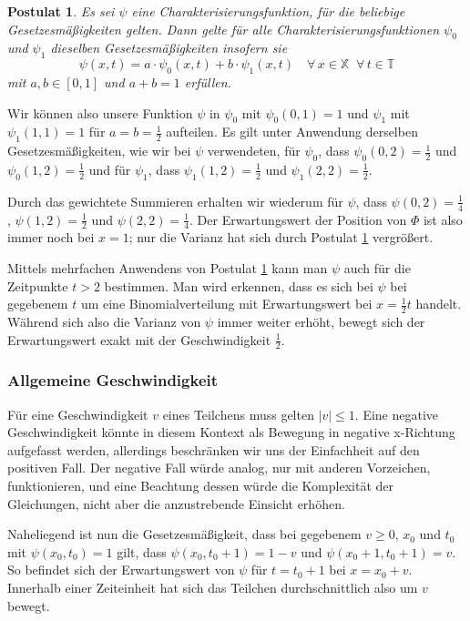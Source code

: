 \documentclass[a4paper,12pt,ngerman]{scrartcl}
\theoremstyle{plain}
\theoremstyle{plain}
\theoremstyle{plain}
\newtheorem{postulate}{Postulat}
\theoremstyle{plain}
\newcommand{\T}{\mathbb{T}}
\newcommand{\X}{\mathbb{X}}
\begin{document}
{
\begin{postulate}\label{pos_einstein}
Es sei $\psi$ eine Charakterisierungsfunktion, für die beliebige Gesetzesmäßigkeiten gelten. Dann gelte für alle Charakterisierungsfunktionen $\psi_0$ und $\psi_1$ dieselben Gesetzesmäßigkeiten insofern sie
\[\psi(x,t)=a\cdot\psi_0(x,t)+b\cdot\psi_1(x,t)\quad\forall\,x\in\X\;\;\forall\,t \in\T\]
mit $a,b\in[0,1]$ und $a+b=1$ erfüllen.
\end{postulate}
}

Wir können also unsere Funktion $\psi$ in $\psi_0$ mit $\psi_0(0,1)=1$ und $\psi_1$ mit $\psi_1(1,1)=1$ für $a=b=\frac{1}{2}$ aufteilen. Es gilt unter Anwendung derselben Gesetzesmäßigkeiten, wie wir bei $\psi$ verwendeten, für $\psi_0$, dass $\psi_0(0,2)=\frac{1}{2}$ und $\psi_0(1,2)=\frac{1}{2}$ und für $\psi_1$, dass $\psi_1(1,2)=\frac{1}{2}$ und $\psi_1(2,2)=\frac{1}{2}$. 

Durch das gewichtete Summieren erhalten wir wiederum für $\psi$, dass $\psi(0,2)=\frac{1}{4}$, $\psi(1,2)=\frac{1}{2}$ und $\psi(2,2)=\frac{1}{4}$. Der Erwartungswert der Position von $\Phi$ ist also immer noch bei $x=1$; nur die Varianz hat sich durch Postulat \ref{pos_einstein} vergrößert.

Mittels mehrfachen Anwendens von Postulat \ref{pos_einstein} kann man $\psi$ auch für die Zeitpunkte $t>2$ bestimmen. Man wird erkennen, dass es sich bei $\psi$ bei gegebenem $t$ um eine Binomialverteilung mit Erwartungswert bei $x=\frac{1}{2}t$ handelt. Während sich also die Varianz von $\psi$ immer weiter erhöht, bewegt sich der Erwartungswert exakt mit der Geschwindigkeit $\frac{1}{2}$.

\subsubsection{Allgemeine Geschwindigkeit}

Für eine Geschwindigkeit $v$ eines Teilchens muss gelten $|v|\leq 1$. Eine negative Geschwindigkeit könnte in diesem Kontext als Bewegung in negative x-Richtung aufgefasst werden, allerdings beschränken wir uns der Einfachheit auf den positiven Fall. Der negative Fall würde analog, nur mit anderen Vorzeichen, funktionieren, und eine Beachtung dessen würde die Komplexität der Gleichungen, nicht aber die anzustrebende Einsicht erhöhen.

Naheliegend ist nun die Gesetzesmäßigkeit, dass bei gegebenem $v\geq0$, $x_0$ und $t_0$ mit $\psi(x_0,t_0)=1$ gilt, dass $\psi(x_0,t_0+1)=1-v$ und $\psi(x_0+1,t_0+1)=v$. So befindet sich der Erwartungswert von $\psi$ für $t=t_0+1$ bei $x=x_0+v$. Innerhalb einer Zeiteinheit hat sich das Teilchen durchschnittlich also um $v$ bewegt. 
\end{document}
